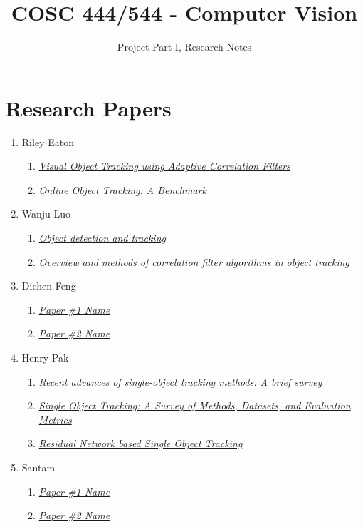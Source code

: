 \documentclass{article}
\title{COSC 444/544 - Computer Vision}
\author{Project Part I, Research Notes}
\begin{document}
\maketitle

\section*{Research Papers}

\begin{enumerate}
\item Riley Eaton
  \begin{enumerate}[label*=\arabic*.]
  \item \textit{\href{https://typeset.io/papers/visual-object-tracking-using-adaptive-correlation-filters-1xuhtpe358}{Visual Object Tracking using Adaptive Correlation Filters}}
  \item \textit{\href{https://faculty.ucmerced.edu/mhyang/papers/cvpr13_benchmark.pdf}{Online Object Tracking: A Benchmark}}
  \end{enumerate}
\item Wanju Luo
  \begin{enumerate}[label*=\arabic*.]
  \item \textit{\href{https://www.sciencedirect.com/science/article/pii/B9780323857871000166?via%3Dihub}{Object detection and tracking}}
  \item \textit{\href{https://link.springer.com/article/10.1007/s40747-020-00161-4}{Overview and methods of correlation filter algorithms in object tracking}}
  \end{enumerate}
\item Dichen Feng
  \begin{enumerate}[label*=\arabic*.]
  \item \textit{\href{paper_link_here}{Paper \#1 Name}}
  \item \textit{\href{paper_link_here}{Paper \#2 Name}}
  \end{enumerate}
\item Henry Pak
  \begin{enumerate}[label*=\arabic*.]
  \item \textit{\href{https://www.sciencedirect.com/science/article/pii/S0925231221007220}{Recent advances of single-object tracking methods: A brief survey}}
  \item \textit{\href{https://arxiv.org/abs/2201.13066}{Single Object Tracking: A Survey of Methods, Datasets, and Evaluation Metrics}}
  \item \textit{\href{https://ieeexplore.ieee.org/document/9774086}{Residual Network based Single Object Tracking}}
  \end{enumerate}
\item Santam
  \begin{enumerate}[label*=\arabic*.]
  \item \textit{\href{paper_link_here}{Paper \#1 Name}}
  \item \textit{\href{paper_link_here}{Paper \#2 Name}}
  \end{enumerate}
\end{enumerate}
\end{document}
